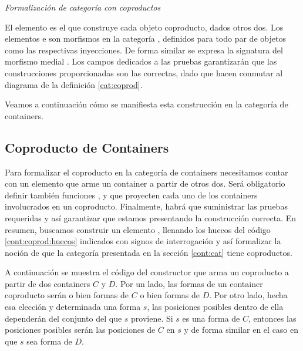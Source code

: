 \begin{agdacode}{\it Formalización de categoría con coproductos}\hspace{3ex}\label{code:hasCoproducts}
  
\end{agdacode}

El elemento  es el que construye cada objeto coproducto, dados otros dos. Los elementos  e  son morfismos en la categoría \AgdaBound{\C}, definidos para todo par de objetos  como las respectivas inyecciones. De forma similar se expresa la signatura del morfismo medial . 
Los campos dedicados a las pruebas garantizarán que las construcciones proporcionadas son las correctas, dado que hacen conmutar al diagrama de la definición \ref{cat:coprod}.



 Veamos a continuación cómo se manifiesta esta construcción en la categoría de containers.

\subsection{Coproducto de Containers}

Para formalizar el coproducto en la categoría de containers necesitamos contar con un elemento  que arme un container a partir de otros dos. Será obligatorio definir también funciones ,  y  que proyecten cada uno de los containers involucrados en un coproducto. Finalmente, habrá que suministrar las pruebas requeridas y así garantizar que estamos presentando la construcción correcta.  
En resumen, buscamos construir un elemento , llenando los huecos del código \ref{cont:coprod:huecos} indicados con signos de interrogación y así formalizar la noción de que la categoría \AgdaFunction{$\Cont$} presentada en la sección \ref{cont:cat} tiene coproductos.
\begin{agdacode}\hspace{1ex}\label{cont:coprod:huecos}
  
\end{agdacode}

A continuación se muestra el código del constructor  que arma un coproducto a partir de dos containers $C$ y $D$. Por un lado, las formas de un container coproducto serán o bien formas de $C$ o bien formas de $D$. Por otro lado, hecha esa elección y determinada una forma $s$, las posiciones posibles dentro de ella dependerán del conjunto del que $s$ proviene. Si $s$ es una forma de $C$, entonces las posiciones posibles serán las posiciones de $C$ en $s$ y de forma similar en el caso en que $s$ sea forma de $D$.

